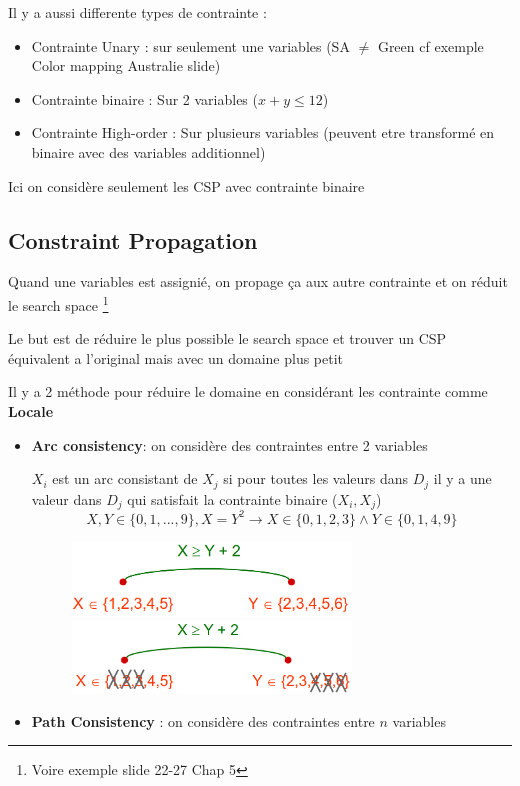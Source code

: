 	Il y a aussi differente types de contrainte :
	\begin{itemize}
		\item Contrainte Unary : sur seulement une variables (SA $\neq$ Green cf exemple Color mapping Australie slide)
		\item Contrainte binaire : Sur 2 variables ($x+y \leq 12$)
		\item Contrainte High-order : Sur plusieurs variables (peuvent etre transformé en binaire avec des variables additionnel)
	\end{itemize}
		
		Ici on considère seulement les CSP avec contrainte binaire
	
	\subsection{Constraint Propagation}
		Quand une variables est assignié, on propage ça aux autre contrainte et on réduit le search space \footnote{Voire exemple slide 22-27 Chap 5}
		
		Le but est de réduire le plus possible le search space et trouver un CSP équivalent a l'original mais avec un domaine plus petit
		
		Il y a 2 méthode pour réduire le domaine en considérant les contrainte comme \textbf{Locale}
		\begin{itemize}
			\item \textbf{Arc consistency}: on considère des contraintes entre 2 variables
			
				$X_i$ est un arc consistant de $X_j$ si pour toutes les valeurs dans $D_j$ il y a une valeur dans $D_j$ qui satisfait la contrainte binaire ($X_i,X_j$)
				\begin{equation}
					X,Y \in \{0,1,...,9\}, X = Y^2 \rightarrow X \in \{0,1,2,3\} \wedge Y \in \{0,1,4,9\}
				\end{equation}
				
				\begin{figure}[H]
					\centering
					\includegraphics[width=0.7\textwidth]{img/arc.png}
					\includegraphics[width=0.7\textwidth]{img/arc1.png}
				\end{figure}
			\item \textbf{Path Consistency} : on considère des contraintes entre $n$ variables
		\end{itemize}
				
